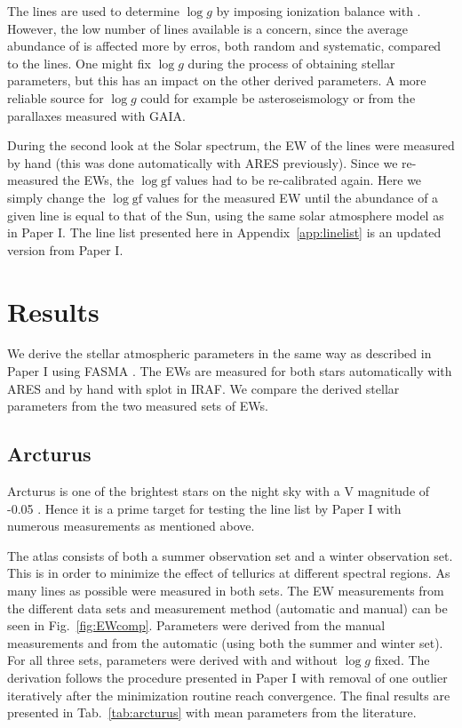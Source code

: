 \documentclass{aa}
\begin{document}
The  lines are used to determine $\log g$ by imposing ionization
balance with . However, the low number of  lines
available is a concern, since the average abundance of  is affected
more by erros, both random and systematic, compared to the  lines.
One might fix $\log g$ during the process of obtaining stellar parameters, but
this has an impact on the other derived parameters. A more reliable source for
$\log g$ could for example be asteroseismology or from the parallaxes measured
with GAIA.

During the second look at the Solar spectrum, the EW of the lines were measured
by hand (this was done automatically with ARES previously). Since we re-measured
the EWs, the $\log \mathrm{gf}$ values had to be re-calibrated again. Here we
simply change the $\log \mathrm{gf}$ values for the measured EW until the
abundance of a given line is equal to that of the Sun, using the same solar
atmosphere model as in Paper I. The line list presented here in
Appendix~\ref{app:linelist} is an updated version from Paper I.


\section{Results}
\label{sec:results}

We derive the stellar atmospheric parameters in the same way as described in
Paper I using FASMA \citep{Andreasen2017a}. The EWs are measured
for both stars automatically with ARES \citep{Sousa2015a} and by hand with splot
in IRAF. We compare the derived stellar parameters from the two measured sets of
EWs.


\subsection{Arcturus}
\label{sec:arcturus}

Arcturus is one of the brightest stars on the night sky with a V magnitude of
-0.05 \citep{Ducati2002}. Hence it is a prime target for testing the line list
by Paper I with numerous measurements as mentioned above.

The atlas consists of both a summer observation set and a winter observation
set. This is in order to minimize the effect of tellurics at different spectral
regions. As many lines as possible were measured in both sets. The EW
measurements from the different data sets and measurement method (automatic and
manual) can be seen in Fig.~\ref{fig:EWcomp}. Parameters were derived from the
manual measurements and from the automatic (using both the summer and winter
set). For all three sets, parameters were derived with and without $\log g$
fixed. The derivation follows the procedure presented in Paper I with removal of
one outlier iteratively after the minimization routine \citep{Andreasen2017a}
reach convergence. The final results are presented in Tab.~\ref{tab:arcturus}
with mean parameters from the literature.
\end{document}
